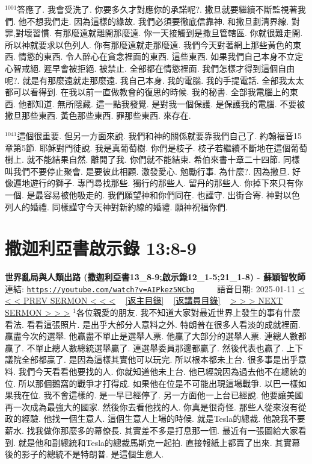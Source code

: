 \documentclass{book}
\begin{document}
$^{1001}$答應了.
我會受洗了.
你要多久才對應你的承諾呢?.
撒旦就要繼續不斷監視著我們.
他不想我們走.
因為這樣的緣故.
我們必須要徹底信靠神.
和撒旦劃清界線.
對罪,對壞習慣.
有那麼遠就離開那麼遠.
你一天接觸到是撒旦管轄區.
你就很難走開.
所以神就要求以色列人.
你有那麼遠就走那麼遠.
我們今天對著網上那些黃色的東西.
情慾的東西.
令人醉心在貪念裡面的東西.
這些東西.
如果我們自己本身不立定心智戒絕.
遲早會被拒絕.
被禁止.
全部都在情慾裡面.
我們怎樣才得到這個自由呢?.
就是有那麼遠就走那麼遠.
我自己本身.
我的電腦.
我的手提電話.
全部我太太都可以看得到.
在我以前一直做教會的復思的時候.
我的秘書.
全部我電腦上的東西.
他都知道.
無所隱藏.
這一點我發覺.
是對我一個保護.
是保護我的電腦.
不要被撒旦那些東西.
黃色那些東西.
罪那些東西.
來存在.

$^{1041}$這個很重要.
但另一方面來說.
我們和神的關係就要靠我們自己了.
約翰福音15章第5節.
耶穌對門徒說.
我是真葡萄樹.
你們是枝子.
枝子若繼續不斷地在這個葡萄樹上.
就不能結果自然.
離開了我.
你們就不能結束.
希伯來書十章二十四節.
同樣叫我們不要停止聚會.
是要彼此相顧.
激發愛心.
勉勵行事.
為什麼?.
因為撒旦.
好像遍地遊行的獅子.
專門尋找那些.
獨行的那些人.
留丹的那些人.
你掉下來只有你一個.
是最容易被他吸走的.
我們願望神和你們同在.
也謹守.
出街合寄.
神對以色列人的婚禮.
同樣謹守今天神對新約線的婚禮.
願神祝福你們.
\newpage



\section{撒迦利亞書啟示錄 13:8-9}
\label{sec:AIPkez5NCbg}
\textbf{世界亂局與人類出路 (撒迦利亞書13\_8-9;啟示錄12\_1-5;21\_1-8) -  蘇穎智牧師}
\newline
\newline
連結: \href{https://youtube.com/watch?v=AIPkez5NCbg}{\texttt{https://youtube.com/watch?v=AIPkez5NCbg}} ~~~~ 語音日期: 2025-01-11
\newline
\newline
\hyperref[sec:QwQqFfjJiJo]{< < < PREV SERMON < < <}
~
\hyperlink{toc}{[返主目錄]}
~
\hyperref[ch:preacher10]{[返講員目錄]}
~
\hyperref[sec:prT7wwZLltI]{> > > NEXT SERMON > > >}
\newline
\newline
$^{1}$各位親愛的朋友.
我不知道大家對最近世界上發生的事有什麼看法.
看看這張照片.
是出乎大部分人意料之外.
特朗普在很多人看淡的成就裡面.
贏盡今次的選舉.
他贏盡不單止是選舉人票.
他贏了大部分的選舉人票.
連總人數都贏了.
不單止總人數總統選舉贏了.
連選舉委員那邊都贏了.
然後代表也贏了.
上下議院全部都贏了.
是因為這樣其實他可以玩完.
所以根本都未上台.
很多事是出乎意料.
我們今天看看他要找的人.
你就知道他未上台.
他已經說因為過去他不在總統的位.
所以那個鵝窩的戰爭才打得成.
如果他在位是不可能出現這場戰爭.
以巴一樣如果我在位.
我不會這樣的.
是一早已經停了.
另一方面他一上台已經說.
他要讓美國再一次成為最強大的國家.
然後你去看他找的人.
你真是很奇怪.
那些人從來沒有從政的經驗.
他找一個生意人.
這個生意人上場的時候.
就是Tesla的總裁.
他說我不要薪水.
找我做你那麼多的幕僚長.
其實差不多是打息那一個.
最近有一張圖給大家看到.
就是他和副總統和Tesla的總裁馬斯克一起拍.
直接報紙上都賣了出來.
其實幕後的影子的總統不是特朗普.
是這個生意人.
\end{document}

